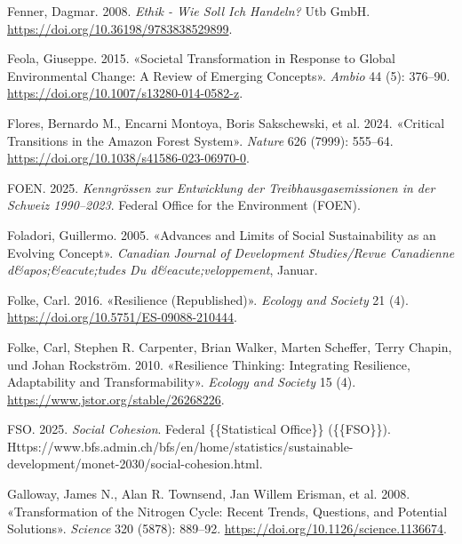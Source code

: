 \documentclass[
  nswissgerman,
  a4paper,
  DIV=11,
  numbers=noendperiod,
  oneside,
  openany]{scrreprt}
\newlength{\cslhangindent}
\newenvironment{CSLReferences}[2] %
 {\begin{list}{}{%
  \setlength{\itemindent}{0pt}
  \setlength{\leftmargin}{0pt}
  \setlength{\parsep}{0pt}
  \ifodd #1
   \setlength{\leftmargin}{\cslhangindent}
   \setlength{\itemindent}{-1\cslhangindent}
  \fi
  \setlength{\itemsep}{#2\baselineskip}}}
 {\end{list}}
\begin{document}
\begin{CSLReferences}{1}{1}
Fenner, Dagmar. 2008. \emph{Ethik - {Wie} Soll Ich Handeln?} Utb GmbH.
\url{https://doi.org/10.36198/9783838529899}.

Feola, Giuseppe. 2015. {«Societal Transformation in Response to Global
Environmental Change: {A} Review of Emerging Concepts»}. \emph{Ambio} 44
(5): 376--90. \url{https://doi.org/10.1007/s13280-014-0582-z}.

{Flores, Bernardo M., Encarni Montoya, Boris Sakschewski, et al.} 2024.
{«Critical Transitions in the {Amazon} Forest System»}. \emph{Nature}
626 (7999): 555--64. \url{https://doi.org/10.1038/s41586-023-06970-0}.

FOEN. 2025. \emph{{Kenngrössen zur Entwicklung der
Treibhausgasemissionen in der Schweiz 1990--2023}}. Federal Office for
the Environment (FOEN).

Foladori, Guillermo. 2005. {«Advances and {Limits} of {Social
Sustainability} as an {Evolving Concept}»}. \emph{Canadian Journal of
Development Studies/Revue Canadienne d\&apos;\&eacute;tudes Du
d\&eacute;veloppement}, Januar.

Folke, Carl. 2016. {«Resilience ({Republished})»}. \emph{Ecology and
Society} 21 (4). \url{https://doi.org/10.5751/ES-09088-210444}.

Folke, Carl, Stephen R. Carpenter, Brian Walker, Marten Scheffer, Terry
Chapin, und Johan Rockström. 2010. {«Resilience {Thinking}:
{Integrating} {Resilience}, {Adaptability} and {Transformability}»}.
\emph{Ecology and Society} 15 (4).
\url{https://www.jstor.org/stable/26268226}.

FSO. 2025. \emph{Social Cohesion}. Federal \{\{Statistical Office\}\}
(\{\{FSO\}\}).
Https://www.bfs.admin.ch/bfs/en/home/statistics/sustainable-development/monet-2030/social-cohesion.html.

Galloway, James N., Alan R. Townsend, Jan Willem Erisman, et al. 2008.
{«Transformation of the {Nitrogen Cycle}: {Recent Trends}, {Questions},
and {Potential Solutions}»}. \emph{Science} 320 (5878): 889--92.
\url{https://doi.org/10.1126/science.1136674}.


\end{CSLReferences}
\end{document}

